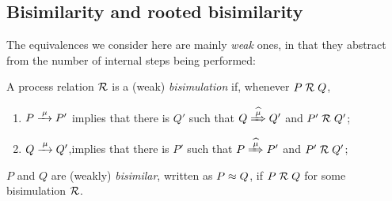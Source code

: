 \subsection{Bisimilarity and rooted bisimilarity}
\label{ss:BiEx}

The equivalences we consider here are mainly \emph{weak} ones, in that they
abstract from the number of internal steps being performed:
\begin{definition}%
\label{d:wb}
A process relation ${{\cal R}}$ is a (weak) \emph{bisimulation} if, whenever
 $P\mathrel{\cal R} Q$, %
\begin{enumerate}
\item $P \arr\mu P'$ implies that there is $Q'$ such that $Q \Arcap \mu Q'$ and $P' \mathrel{\cal R} Q'$;
\item $Q \arr\mu Q'$,implies that there is $P'$ such that $P \Arcap
  \mu P'$ and $P' \mathrel{\cal R} Q'$;
\end{enumerate}
 $P$ and $Q$ are (weakly) \emph{bisimilar},
written as $P \approx Q$, if $P \mathrel{\cal R} Q$ for some bisimulation ${\cal R}$.
\end{definition}

